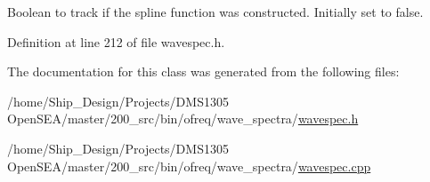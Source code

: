Boolean to track if the spline function was constructed. Initially set to false. 



Definition at line 212 of file wavespec.\-h.



The documentation for this class was generated from the following files\-:\begin{DoxyCompactItemize}
\item 
/home/\-Ship\-\_\-\-Design/\-Projects/\-D\-M\-S1305 Open\-S\-E\-A/master/200\-\_\-src/bin/ofreq/wave\-\_\-spectra/\hyperlink{wavespec_8h}{wavespec.\-h}\item 
/home/\-Ship\-\_\-\-Design/\-Projects/\-D\-M\-S1305 Open\-S\-E\-A/master/200\-\_\-src/bin/ofreq/wave\-\_\-spectra/\hyperlink{wavespec_8cpp}{wavespec.\-cpp}\end{DoxyCompactItemize}
